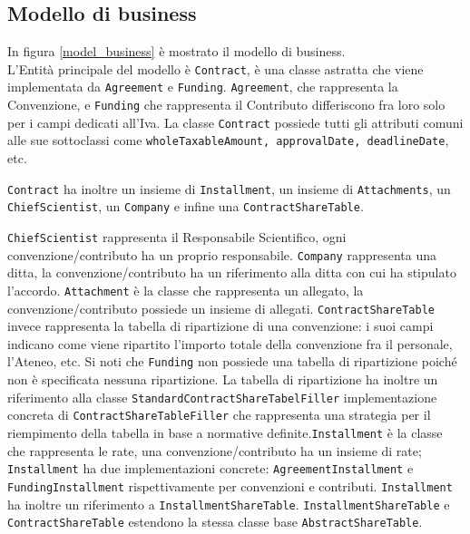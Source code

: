 \subsection{Modello di business}

In figura \ref{model_business} è mostrato il modello di business. \\

L'Entità principale del modello è \texttt{Contract}, è una classe astratta che viene implementata da \texttt{Agreement} e \texttt{Funding}.
\texttt{Agreement}, che rappresenta la Convenzione, e \texttt{Funding} che rappresenta il Contributo differiscono fra loro solo per i campi dedicati all'Iva. La classe \texttt{Contract} possiede
tutti gli attributi comuni alle sue sottoclassi come \texttt{wholeTaxableAmount, approvalDate, deadlineDate}, etc.


\texttt{Contract} ha inoltre un insieme di \texttt{Installment}, un insieme di \texttt{Attachments}, un \texttt{ChiefScientist}, un \texttt{Company} e infine una \texttt{ContractShareTable}.

\texttt{ChiefScientist} rappresenta il Responsabile Scientifico, ogni convenzione/contributo ha un proprio responsabile.
\texttt{Company} rappresenta una ditta, la convenzione/contributo ha un riferimento alla ditta con cui ha stipulato l'accordo.
\texttt{Attachment} è la classe che rappresenta un allegato, la convenzione/contributo possiede un insieme di allegati.
\texttt{ContractShareTable} invece rappresenta la tabella di ripartizione di una convenzione: i suoi campi indicano come viene ripartito l'importo totale della convenzione fra il personale, l'Ateneo, etc.
Si noti che \texttt{Funding} non possiede una tabella di ripartizione poiché non è specificata nessuna ripartizione.
La tabella di ripartizione ha inoltre un riferimento alla classe \texttt{StandardContractShareTabelFiller} implementazione concreta di \texttt{ContractShareTableFiller} che rappresenta una strategia per il riempimento della tabella in base
a normative definite.\texttt{Installment} è la classe che rappresenta le rate, una convenzione/contributo ha un insieme di rate; \texttt{Installment} ha due implementazioni concrete: \texttt{AgreementInstallment} e \texttt{FundingInstallment} rispettivamente
per convenzioni e contributi. \texttt{Installment} ha inoltre un riferimento a \texttt{InstallmentShareTable}. \texttt{InstallmentShareTable} e \texttt{ContractShareTable} estendono la stessa classe base \texttt{AbstractShareTable}.



